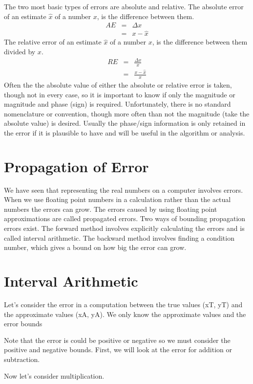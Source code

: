 The two most basic types of errors are absolute and relative.  The absolute error of an estimate $\hat x$ of a number $x$, is the difference between them.
\begin{eqnarray}
AE&=&\Delta x\\
  &=&x-\hat x
\end{eqnarray}
The relative error of an estimate $\hat x$ of a number $x$, is the difference between them divided by $x$.
\begin{eqnarray}
RE&=&\frac{\Delta x}{x}\\
  &=&\frac{x-\hat x}{x}
\end{eqnarray}
Often the the absolute value of either the absolute or relative error is taken, though not in every case, so it is important to know if only the magnitude or magnitude and phase (sign) is required.  Unfortunately, there is no standard nomenclature or convention, though more often than not the magnitude (take the absolute value) is desired. Usually the phase/sign information is only retained in the error if it is plausible to have and will be useful in the algorithm or analysis.

\section{Propagation of Error}
We have seen that representing the real numbers on a computer involves errors.  When we use floating point numbers in a calculation rather than the actual numbers the errors can grow.  The errors caused by using floating point approximations are called propagated errors.  Two ways of bounding propagation errors exist.  The forward method involves explicitly calculating the errors and is called interval arithmetic.  The backward method involves finding a condition number, which gives a bound on how big the error can grow.

\section{Interval Arithmetic}

Let's consider the error in a computation between the true values (xT, yT) and the approximate values (xA, yA).  We only know the approximate values and the error bounds

Note that the error is could be positive or negative so we must consider the positive and negative bounds.  First, we will look at the error for addition or subtraction.

Now let's consider multiplication.

